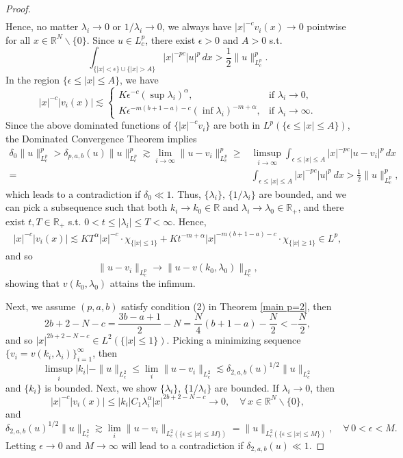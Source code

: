 \documentclass[11pt]{article}
\newcommand{\R}{\mathbb{R}}
\numberwithin{equation}{section}
\begin{document}
\begin{proof}
\begin{align*}
    \end{align*}
    Hence, no matter $\lambda_i\to 0$ or $1/\lambda_i \to 0$, we always have $|x|^{-c}v_i(x) \to 0$ pointwise for all $x\in\R^N\backslash\{0\}$. Since $u\in L^p_c$, there exist $\epsilon>0$ and $A>0$ s.t.
    \begin{equation*}
        \int_{\{|x|<\epsilon\}\cup \{|x|>A\}} |x|^{-pc}|u|^p\,dx > \frac 12 \|u\|_{L_c^p}^p.
    \end{equation*}
    In the region $\{\epsilon\le |x|\le A\}$, we have
    \begin{equation*}
        |x|^{-c}|v_i(x)| \lesssim \begin{cases}
            K\epsilon^{-c}\left(\sup \lambda_i\right)^\alpha, & \text{if $\lambda_i\to 0$},\\
            K\epsilon^{-m(b+1-a)-c}\left(\inf \lambda_i\right)^{-m+\alpha}, & \text{if $\lambda_i\to \infty$}.
        \end{cases}
    \end{equation*}
    Since the above dominated functions of $\{|x|^{-c}v_i\}$ are both in $L^p(\{\epsilon\le |x|\le A\})$, the Dominated Convergence Theorem implies
    \begin{align*}
        \delta_0\|u\|_{L^p_c}^p > \delta_{p,a,b}(u)\|u\|_{L^p_c}^p \gtrsim  \lim_{i\to \infty}\|u-v_i\|_{L^p_c}^p \ge{}& \limsup_{i\to \infty} \int_{\epsilon\le |x|\le A} |x|^{-pc}|u-v_i|^p\,dx \\
        ={}& \int_{\epsilon\le |x|\le A} |x|^{-pc}|u|^p\,dx > \frac 12 \|u\|^p_{L^p_c},
    \end{align*}
    which leads to a contradiction if $\delta_0\ll  1$. Thus, $\{\lambda_i\},\,\{1/\lambda_i\}$ are bounded, and we can pick a subsequence such that both $k_i\to k_0\in \R$ and $\lambda_i\to \lambda_0\in\R_+$, and there exist $t,T\in \R_+$ s.t. $0<t\le |\lambda_i|\le T<\infty$. Hence,
    \begin{align*}
        |x|^{-c}|v_i(x)| \lesssim KT^{\alpha}|x|^{-c}\cdot \chi_{\{|x|\le 1\}} + Kt^{-m+\alpha}|x|^{-m(b+1-a)-c}\cdot\chi_{\{|x|\ge 1\}} \in L^p,
    \end{align*}
    and so
    \[ \|u-v_i\|_{L^p_c} \to \|u-v(k_0,\lambda_0)\|_{L^p_c},\]
    showing that $v(k_0,\lambda_0)$ attains the infimum.

    Next, we assume $(p,a,b)$ satisfy condition (2) in Theorem \ref{main p=2}, then
    \[ 2b+2-N-c = \frac{3b-a+1}{2}-N = \frac{N}{4}(b+1-a)-\frac N2 < -\frac N2,\]
    and so $|x|^{2b+2-N-c}\in L^2(\{|x|\le 1\})$. Picking a minimizing sequence $\{v_i=v(k_i,\lambda_i)\}_{i=1}^{\infty}$, then
    \[ \limsup_i |k_i|-\|u\|_{L^2_c} \le \lim_i \|u-v_i\|_{L^2_c} \lesssim \delta_{2,a,b}(u)^{1/2}\|u\|_{L^2_c}\]
    and $\{k_i\}$ is bounded. Next, we show $\{\lambda_i\},\,\{1/\lambda_i\}$ are bounded. If $\lambda_i\to 0$, then
    \[ |x|^{-c}|v_i(x)| \le |k_i|C_1\lambda_i^\alpha |x|^{2b+2-N-c} \to 0,\quad \forall\, x\in \R^N\backslash\{0\},\]
    and
    \[ \delta_{2,a,b}(u)^{1/2}\|u\|_{L^2_c} \gtrsim \lim_i \|u-v_i\|_{L^2_c(\{\epsilon\le |x|\le M\})} = \|u\|_{L^2_c(\{\epsilon\le |x|\le M\})},\quad \forall\, 0<\epsilon<M. \]
    Letting $\epsilon \to 0$ and $M\to \infty$ will lead to a contradiction if $\delta_{2,a,b}(u)\ll 1$.


\end{proof}
\end{document}
